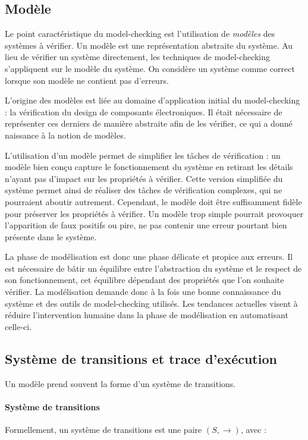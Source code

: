 \subsection{Modèle}

Le point caractéristique du model-checking est l'utilisation de
\emph{modèles} des systèmes à vérifier. Un modèle est une représentation
abstraite du système. Au lieu de vérifier un système directement, les techniques
de model-checking s'appliquent sur le modèle du système. On considère un
système comme correct lorsque son modèle ne contient pas d'erreurs.

L'origine des modèles est liée au domaine d'application initial du
model-checking : la vérification du design de composants électroniques. Il
était nécessaire de représenter ces derniers de manière abstraite afin de les
vérifier, ce qui a donné naissance à la notion de modèles.

L'utilisation d'un modèle permet de simplifier les tâches de vérification : un
modèle bien conçu capture le fonctionnement du système en retirant les détails
n'ayant pas d'impact sur les propriétés à vérifier. Cette version simplifiée du
système permet ainsi de réaliser des tâches de vérification complexes, qui ne
pourraient aboutir autrement. Cependant, le modèle doit être suffisamment fidèle
pour préserver les propriétés à vérifier. Un modèle trop simple pourrait
provoquer l'apparition de faux positifs ou pire, ne pas contenir une erreur
pourtant bien présente dans le système.

La phase de modélisation est donc une phase délicate et propice aux erreurs. Il
est nécessaire de bâtir un équilibre entre l'abstraction du système et le
respect de son fonctionnement, cet équilibre dépendant des propriétés que l'on
souhaite vérifier. La modélisation demande donc à la fois une bonne connaissance
du système et des outils de model-checking utilisés. Les tendances actuelles
visent à réduire l'intervention humaine dans la phase de modélisation en
automatisant celle-ci.

\subsection{Système de transitions et trace d'exécution}

Un modèle prend souvent la forme d'un système de transitions.

\paragraph{Système de transitions}
Formellement, un système de transitions est une paire \((S, \rightarrow)\),
avec :

